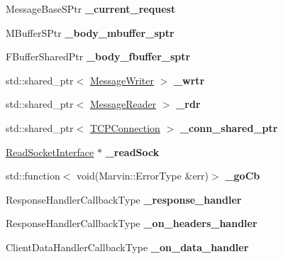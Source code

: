 \begin{DoxyCompactItemize}
\mbox{\label{class_client_a4a87fac91903111214bfc059a871a5ba}} 
Message\+Base\+S\+Ptr {\bfseries \+\_\+current\+\_\+request}
\item 
\mbox{\label{class_client_ae61b6b1b65599c17c28f8627760ea684}} 
M\+Buffer\+S\+Ptr {\bfseries \+\_\+body\+\_\+mbuffer\+\_\+sptr}
\item 
\mbox{\label{class_client_abc69353f4a7afea1d9a485de18350c08}} 
F\+Buffer\+Shared\+Ptr {\bfseries \+\_\+body\+\_\+fbuffer\+\_\+sptr}
\item 
\mbox{\label{class_client_a60ba27f037924a099b13dcbace4425cc}} 
std\+::shared\+\_\+ptr$<$ \hyperlink{class_message_writer}{Message\+Writer} $>$ {\bfseries \+\_\+wrtr}
\item 
\mbox{\label{class_client_a27fdd6a6489468f01efa06f8376bf9bb}} 
std\+::shared\+\_\+ptr$<$ \hyperlink{class_message_reader}{Message\+Reader} $>$ {\bfseries \+\_\+rdr}
\item 
\mbox{\label{class_client_a4e06284228a92f6e91b00ef170fc6ae1}} 
std\+::shared\+\_\+ptr$<$ \hyperlink{class_t_c_p_connection}{T\+C\+P\+Connection} $>$ {\bfseries \+\_\+conn\+\_\+shared\+\_\+ptr}
\item 
\mbox{\label{class_client_a3291b49a7c5c40886e31aa05a562602f}} 
\hyperlink{class_read_socket_interface}{Read\+Socket\+Interface} $\ast$ {\bfseries \+\_\+read\+Sock}
\item 
\mbox{\label{class_client_a02e33df170f88dbda08fe9cd0b3a0025}} 
std\+::function$<$ void(Marvin\+::\+Error\+Type \&err)$>$ {\bfseries \+\_\+go\+Cb}
\item 
\mbox{\label{class_client_a8d085507b14c836cbda0749ca2decb56}} 
Response\+Handler\+Callback\+Type {\bfseries \+\_\+response\+\_\+handler}
\item 
\mbox{\label{class_client_ab417dd0da30a89767811a717b5c6a14f}} 
Response\+Handler\+Callback\+Type {\bfseries \+\_\+on\+\_\+headers\+\_\+handler}
\item 
\mbox{\label{class_client_af785f3d2d211634bf74dd35c5b523f75}} 
Client\+Data\+Handler\+Callback\+Type {\bfseries \+\_\+on\+\_\+data\+\_\+handler}
\end{DoxyCompactItemize}
